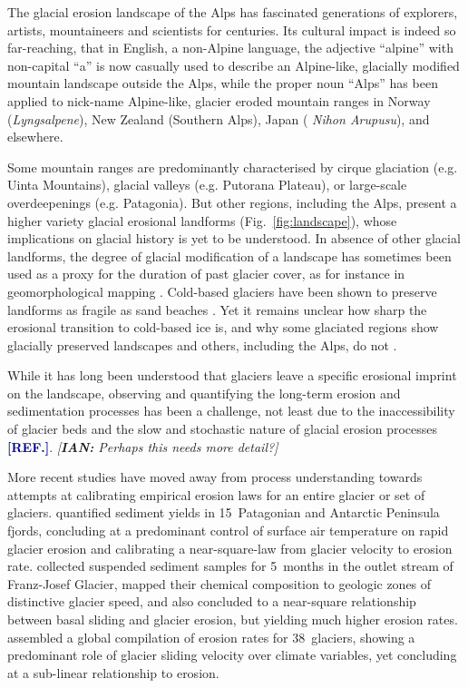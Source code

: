 \documentclass[utf8]{article}
\newcommand{\aref}[0]{\textcolor{darkblue}{\textbf{[REF.]}}}
\newcommand{\ian}[1]{\textcolor{darkbrown}{\emph{[\textbf{IAN:} #1]}}}
\begin{document}
    The glacial erosion landscape of the Alps has fascinated generations of
    explorers, artists, mountaineers and scientists for centuries. Its cultural
    impact is indeed so far-reaching, that in English, a non-Alpine language,
    the adjective ``alpine'' with non-capital ``a'' is now casually used to
    describe an Alpine-like, glacially modified mountain landscape outside the
    Alps, while the proper noun ``Alps'' has been applied to nick-name
    Alpine-like, glacier eroded mountain ranges in Norway (\emph{Lyngsalpene}),
    New Zealand (Southern Alps), Japan
    (\emph{%
    Nihon Arupusu}), and elsewhere.

    Some mountain ranges are predominantly characterised by cirque glaciation
    (e.g. Uinta Mountains), glacial valleys (e.g. Putorana Plateau), or
    large-scale overdeepenings (e.g. Patagonia). But other regions, including
    the Alps, present a higher variety glacial erosional landforms
    (Fig.~\ref{fig:landscape}), whose implications on glacial history is yet to
    be understood.
    In absence of other glacial landforms, the degree of glacial modification
    of a landscape has sometimes been used as a proxy for the duration of past
    glacier cover, as for instance in geomorphological mapping
    \citep[e.g.][]{Margold.etal.2011, Fu.etal.2012}. Cold-based glaciers have
    been shown to preserve landforms as fragile as sand beaches
    \citep{Kleman.1994}. Yet it remains unclear how sharp the erosional
    transition to cold-based ice is, and why some glaciated regions show
    glacially preserved landscapes and others, including the Alps, do not
    \citep{Wirsig.etal.2016, Seguinot.etal.2018}.

    While it has long been understood that glaciers leave a specific erosional
    imprint on the landscape, observing and quantifying the long-term erosion
    and sedimentation processes has been a challenge, not least due to the
    inaccessibility of glacier beds and the slow and stochastic nature of
    glacial erosion processes \aref. \ian{Perhaps this needs more detail?}

    More recent studies have moved away from process
    understanding towards attempts at calibrating empirical erosion laws for an entire
    glacier or set of glaciers. \citet{Koppes.etal.2015} quantified sediment
    yields in 15~Patagonian and Antarctic Peninsula fjords, concluding at a
    predominant control of surface air temperature on rapid glacier erosion and
    calibrating a near-square-law from glacier velocity to erosion rate.
    \citet{Herman.etal.2015} collected suspended sediment samples for 5~months
    in the outlet stream of Franz-Josef Glacier, mapped their chemical
    composition to geologic zones of distinctive glacier speed, and also
    concluded to a near-square relationship between basal sliding and glacier
    erosion, but yielding much higher erosion rates.
    \citet{Cook.etal.2020} assembled a global compilation of erosion rates for
    38~glaciers, showing a predominant role of glacier sliding velocity over
    climate variables, yet concluding at a sub-linear relationship to erosion.
\end{document}
